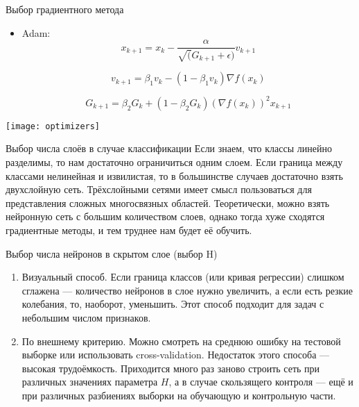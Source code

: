 \documentclass[11pt]{beamer}
\begin{document}
	\begin{frame}{Выбор градиентного метода}
		\begin{itemize}

			\item Adam: 
			\begin{equation*}
				x_{k+1} = x_k - \frac{\alpha}{\sqrt(G_{k+1} + \epsilon)} v_{k+1}
			\end{equation*}
			
			\begin{equation*}
				v_{k+1} = \beta_1 v_k - (1 - \beta_1 v_k)  \nabla f(x_k)
		    \end{equation*}
			
			\begin{equation*}
				G_{k+1} = \beta_2 G_k + (1 - \beta_2 G_k)(\nabla f(x_k))^2 x_{k+1}
			\end{equation*}
		
	   \end{itemize}
	
		\begin{center}
			\begin{minipage}{0.51\linewidth}
				\centering
				\texttt{[image: optimizers]}
			\end{minipage}
		\end{center}

	\end{frame}

	\begin{frame}{Выбор числа слоёв в случае классификации} 
		Если знаем, что классы линейно разделимы, то нам достаточно ограничиться одним слоем. Если граница между классами нелинейная и извилистая, то в большинстве случаев достаточно взять двухслойную сеть. Трёхслойными сетями имеет смысл пользоваться для представления сложных многосвязных областей. Теоретически, можно взять нейронную сеть с большим количеством слоев, однако тогда хуже сходятся градиентные методы, и тем труднее нам будет её обучить.
	\end{frame}

	\begin{frame}{Выбор числа нейронов в скрытом слое (выбор H)}
		\begin{enumerate}
			\item Визуальный способ. Если граница классов (или кривая регрессии) слишком сглажена --- количество нейронов в слое нужно увеличить, а если есть резкие колебания, то, наоборот, уменьшить. Этот способ подходит для задач с небольшим числом признаков.
			\item По внешнему критерию. Можно смотреть на среднюю ошибку на тестовой выборке или использовать cross-validation. Недостаток этого способа --- высокая трудоёмкость. Приходится много раз заново строить сеть при различных значениях параметра $H$, а в случае скользящего контроля --- ещё и при различных разбиениях выборки на обучающую и контрольную части.
		\end{enumerate}
	\end{frame}
\end{document}
